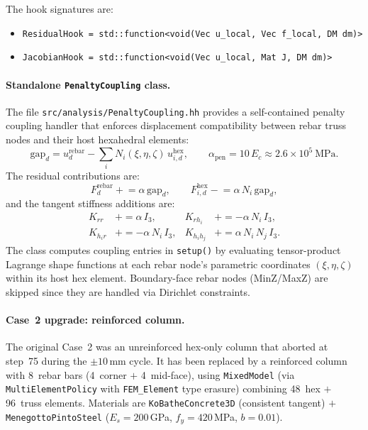 The hook signatures are:
\begin{itemize}
  \item \texttt{ResidualHook = std::function<void(Vec u\_local,
        Vec f\_local, DM dm)>}
  \item \texttt{JacobianHook = std::function<void(Vec u\_local,
        Mat J, DM dm)>}
\end{itemize}

\paragraph{Standalone \texttt{PenaltyCoupling} class.}
The file \texttt{src/analysis/PenaltyCoupling.hh} provides a
self-contained penalty coupling handler that enforces displacement
compatibility between rebar truss nodes and their host hexahedral
elements:
\begin{equation}
  \text{gap}_d = u^{\text{rebar}}_d
                 - \sum_{i} N_i(\xi,\eta,\zeta)\, u^{\text{hex}}_{i,d},
  \qquad
  \alpha_{\text{pen}} = 10\,E_c \approx 2.6 \times 10^{5}~\text{MPa}.
  \label{eq:penalty-gap}
\end{equation}
The residual contributions are:
\begin{equation}
  F^{\text{rebar}}_d \mathrel{+}= \alpha\, \text{gap}_d, \qquad
  F^{\text{hex}}_{i,d} \mathrel{-}= \alpha\, N_i\, \text{gap}_d,
\end{equation}
and the tangent stiffness additions are:
\begin{align}
  K_{rr}  &\mathrel{+}= \alpha\, I_3, &
  K_{rh_i} &\mathrel{+}= -\alpha\, N_i\, I_3, \\
  K_{h_i r} &\mathrel{+}= -\alpha\, N_i\, I_3, &
  K_{h_i h_j} &\mathrel{+}= \alpha\, N_i\, N_j\, I_3.
\end{align}
The class computes coupling entries in \texttt{setup()} by evaluating
tensor-product Lagrange shape functions at each rebar node's
parametric coordinates $(\xi,\eta,\zeta)$ within its host hex element.
Boundary-face rebar nodes (MinZ/MaxZ) are skipped since they are
handled via Dirichlet constraints.

\paragraph{Case~2 upgrade: reinforced column.}
The original Case~2 was an unreinforced hex-only column that aborted
at step~75 during the $\pm 10$\,mm cycle.  It has been replaced by a
reinforced column with 8~rebar bars (4~corner $+$ 4~mid-face), using
\texttt{MixedModel} (via \texttt{MultiElementPolicy} with
\texttt{FEM\_Element} type erasure) combining 48~hex $+$ 96~truss
elements.  Materials are \texttt{KoBatheConcrete3D} (consistent tangent)
$+$ \texttt{MenegottoPintoSteel} ($E_s=200$\,GPa, $f_y=420$\,MPa,
$b=0.01$).

